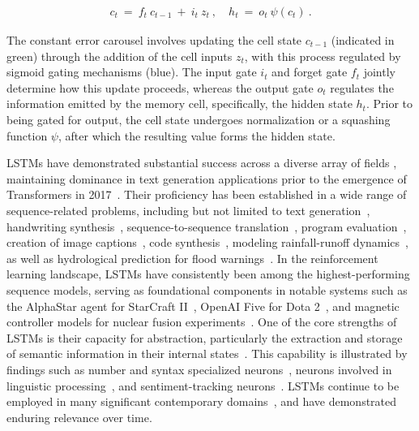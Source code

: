 \begin{align}
\label{eq:lstm_idea}
  c_t \ = \ f_t \ c_{t-1} \ + \ 
          i_t \  z_t \ , \quad  
          h_t \ = \ o_t \ \psi({c_t}) \ . 
\end{align}

The constant error carousel involves updating the cell state $c_{t-1}$ (indicated in green) through the addition of the cell inputs $z_t$, with this process regulated by sigmoid gating mechanisms (blue). The input gate $i_t$ and forget gate $f_t$ jointly determine how this update proceeds, whereas the output gate $o_t$ regulates the information emitted by the memory cell, specifically, the hidden state $h_t$. Prior to being gated for output, the cell state undergoes normalization or a squashing function $\psi$, after which the resulting value forms the hidden state.

LSTMs have demonstrated substantial success across a diverse array of fields \citep{Hochreiter:01,Hochreiter:07,Schmidhuber:15}, maintaining dominance in text generation applications prior to the emergence of Transformers in 2017~\citep{Vaswani:17}. Their proficiency has been established in a wide range of sequence-related problems, including but not limited to text generation~\citep{Graves:13,Karpathy:15blog}, handwriting synthesis~\citep{Graves:13}, sequence-to-sequence translation~\citep{Sutskever:14nips}, program evaluation~\citep{Zaremba:14arxiv}, creation of image captions~\citep{Karpathy:15,Hossain:19}, code synthesis~\citep{Karpathy:15blog}, modeling rainfall-runoff dynamics~\citep{Kratzert:18,Kratzert:19}, as well as hydrological prediction for flood warnings~\citep{Nearing:24}. In the reinforcement learning landscape, LSTMs have consistently been among the highest-performing sequence models, serving as foundational components in notable systems such as the AlphaStar agent for StarCraft II~\citep{Vinyals:17short}, OpenAI Five for Dota 2~\citep{OpenAI:19}, and magnetic controller models for nuclear fusion experiments~\citep{Degrave:22short}. One of the core strengths of LSTMs is their capacity for abstraction, particularly the extraction and storage of semantic information in their internal states~\citep{Karpathy:15blog}. This capability is illustrated by findings such as number and syntax specialized neurons~\citep{Lakretz:19}, neurons involved in linguistic processing~\citep{Bau:19}, and sentiment-tracking neurons~\citep{Radford:17arxiv}. LSTMs continue to be employed in many significant contemporary domains~\citep{Degrave:22short,Nearing:24}, and have demonstrated enduring relevance over time.


